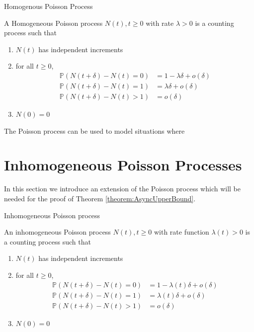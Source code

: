 \begin{definition}
	Homogenous Poisson Process

	\noindent
	A Homogeneous Poisson process ${N(t), t \geq 0}$ with rate $\lambda > 0$ is a counting process such that
	\begin{enumerate}
		\item $N(t)$ has independent increments
		\item for all $t \geq 0$, 
		\begin{align*}
			\mathbb{P}(N(t + \delta) - N(t) = 0) &= 1 - \lambda\delta + o(\delta) \\
			\mathbb{P}(N(t + \delta) - N(t) = 1) &= \lambda\delta + o(\delta) \\
			\mathbb{P}(N(t + \delta) - N(t) > 1) &= o(\delta)
		\end{align*}
		\item $N(0) = 0$
	\end{enumerate}
\end{definition}

The Poisson process can be used to model situations where %


\section{Inhomogeneous Poisson Processes}

In this section we introduce an extension of the Poisson process which will be needed for the proof of Theorem \ref{theorem:AsyncUpperBound}.

\begin{definition}
	Inhomogeneous Poisson process

	\noindent
	An inhomogeneous Poisson process ${N(t), t \geq 0}$ with rate function $\lambda(t) > 0$ is a counting process such that
	\begin{enumerate}
		\item $N(t)$ has independent increments
		\item for all $t \geq 0$, 
		\begin{align*}
			\mathbb{P}(N(t + \delta) - N(t) = 0) &= 1 - \lambda(t)\delta + o(\delta) \\
			\mathbb{P}(N(t + \delta) - N(t) = 1) &= \lambda(t)\delta + o(\delta) \\
			\mathbb{P}(N(t + \delta) - N(t) > 1) &= o(\delta)
		\end{align*}
		\item $N(0) = 0$
	\end{enumerate}
\end{definition}

